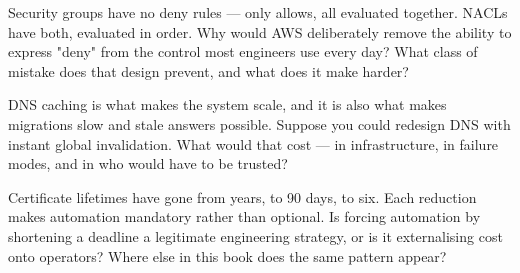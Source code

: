 
\begin{thinkbox}
Security groups have no deny rules --- only allows, all evaluated together. NACLs have both, evaluated in order. Why would AWS deliberately remove the ability to express "deny" from the control most engineers use every day? What class of mistake does that design prevent, and what does it make harder?
\end{thinkbox}

\begin{thinkbox}
DNS caching is what makes the system scale, and it is also what makes migrations slow and stale answers possible. Suppose you could redesign DNS with instant global invalidation. What would that cost --- in infrastructure, in failure modes, and in who would have to be trusted?
\end{thinkbox}

\begin{thinkbox}
Certificate lifetimes have gone from years, to 90 days, to six. Each reduction makes automation mandatory rather than optional. Is forcing automation by shortening a deadline a legitimate engineering strategy, or is it externalising cost onto operators? Where else in this book does the same pattern appear?
\end{thinkbox}


